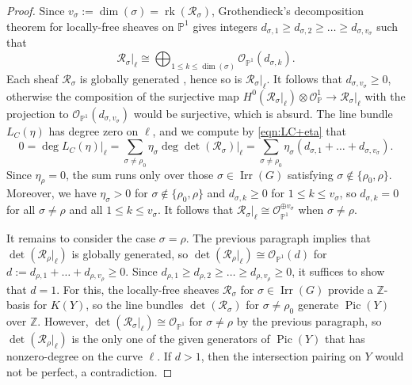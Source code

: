 \documentclass[11pt,reqno]{amsart}
\numberwithin{equation}{section}
\theoremstyle{definition}
\newcommand{\ZZ}{\ensuremath{\mathbb{Z}}}
\newcommand{\0}{\operatorname{0}}
\newcommand{\Irr}{\operatorname{Irr}}
\newcommand{\Pic}{\operatorname{Pic}}
\newcommand{\rank}{\operatorname{rk}}
\begin{document}
\begin{proof}
 Since $v_\sigma:=\dim(\sigma) = \rank(\mathcal{R}_\sigma)$, Grothendieck's decomposition theorem 
 for locally-free sheaves on $\mathbb{P}^1$ 
 gives integers $d_{\sigma,1}\geq d_{\sigma,2}\geq \dots \geq d_{\sigma,v_\sigma}$ such that 
  \begin{equation}
 \label{eqn:Tirestricted}
 \mathcal{R}_\sigma\vert_{\ell}\cong \bigoplus_{1\leq k\leq \dim(\sigma)} \mathcal{O}_{\mathbb{P}^1}(d_{\sigma,k}). 
 \end{equation}
 Each sheaf $\mathcal{R}_\sigma$ is globally generated \cite[Proposition~2.4]{CIK18}, hence so is $\mathcal{R}_\sigma\vert_\ell$. It follows that $d_{\sigma,v_\sigma}\geq 0$, otherwise the composition of the surjective map $H^0(\mathcal{R}_\sigma\vert_\ell)\otimes {\mathcal{O}_\mathbb{P}^1}\to \mathcal{R}_\sigma\vert_\ell$ with the projection to $\mathcal{O}_{\mathbb{P}^1}(d_{\sigma,v_\sigma})$ would be surjective, which is absurd. The line bundle $L_{C}(\eta)$ has degree zero on $\ell$, and we compute by \eqref{eqn:LC+eta} that
 \[
 0 = \deg L_{C}(\eta)\vert_{\ell} = \sum_{\sigma\neq \rho_0} \eta_\sigma \deg \det (\mathcal{R}_\sigma)\vert_{\ell} = \sum_{\sigma\neq \rho_0} \eta_\sigma (d_{\sigma,1}+\dots +d_{\sigma,v_\sigma}).
 \]
 Since $\eta_\rho=0$, the sum runs only over those $\sigma\in \Irr(G)$ satisfying $\sigma\not\in \{\rho_0, \rho\}$. Moreover, we have $\eta_\sigma>0$ for $\sigma\not\in \{\rho_0,\rho\}$ and $d_{\sigma,k}\geq 0$ for $1\leq k\leq v_\sigma$, so $d_{\sigma,k}=0$ for all $\sigma\neq \rho$ and all $1\leq k\leq v_\sigma$. It follows that $\mathcal{R}_\sigma\vert_{\ell}\cong \mathcal{O}_{\mathbb{P}^1}^{\oplus v_\sigma}$ when $\sigma\neq \rho$. 
 
 It remains to consider the case $\sigma=\rho$. The previous paragraph implies that $\det(\mathcal{R}_\rho\vert_\ell)$ is globally generated, so $\det(\mathcal{R}_\rho\vert_{\ell}) \cong \mathcal{O}_{\mathbb{P}^1}(d)$ for $d:=d_{\rho,1}+\dots +d_{\rho,v_\rho}\geq 0$. Since $d_{\rho,1}\geq d_{\rho,2}\geq \dots \geq d_{\rho,v_\rho}\geq 0$, it suffices to show that $d=1$. For this, the locally-free sheaves $\mathcal{R}_\sigma$ for $\sigma\in \Irr(G)$ provide a $\ZZ$-basis for $K(Y)$, so the line bundles $\det(\mathcal{R}_\sigma)$ for $\sigma\neq \rho_0$ generate $\Pic(Y)$ over $\ZZ$. However, $\det(\mathcal{R}_\sigma\vert_{\ell})\cong \mathcal{O}_{\mathbb{P}^1}$ for $\sigma\neq \rho$ by the previous paragraph, so $\det(\mathcal{R}_\rho\vert_\ell)$ is the only one of the given generators of $\Pic(Y)$ that has nonzero-degree on the curve $\ell$. If $d>1$, then the intersection pairing on $Y$ would not be perfect, a contradiction.
 \end{proof}
\end{document}
